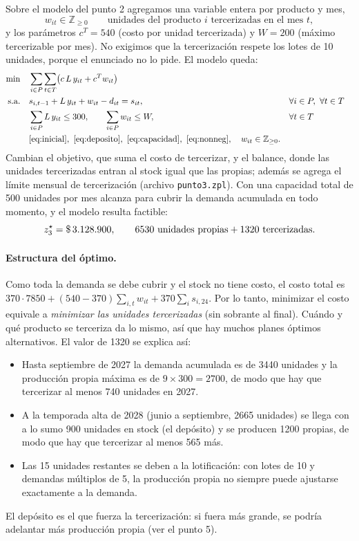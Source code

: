\documentclass[11pt,a4paper]{article}
\begin{document}
Sobre el modelo del punto 2 agregamos una variable entera por producto y mes,
\[
  w_{it} \in \mathbb{Z}_{\ge 0} \qquad \text{unidades del producto } i
  \text{ tercerizadas en el mes } t,
\]
y los parámetros $c^{T} = 540$ (costo por unidad tercerizada) y $W = 200$
(máximo tercerizable por mes). No exigimos que la tercerización respete los
lotes de 10 unidades, porque el enunciado no lo pide. El modelo queda:
\begin{align}
  \min\quad & \sum_{i\in P}\sum_{t\in T} \bigl(c\,L\,y_{it} + c^{T} w_{it}\bigr)
  \label{eq:obj3}\\
  \text{s.a.}\quad
  & s_{i,t-1} + L\,y_{it} + w_{it} - d_{it} = s_{it},
  && \forall i \in P,\ \forall t \in T
  \label{eq:balance3}\\
  & \sum_{i \in P} L\,y_{it} \le 300, \qquad \sum_{i \in P} w_{it} \le W,
  && \forall t \in T
  \label{eq:limites3}\\
  & \eqref{eq:inicial},\ \eqref{eq:deposito},\ \eqref{eq:capacidad},\
    \eqref{eq:nonneg}, \quad w_{it} \in \mathbb{Z}_{\ge 0}. \notag
\end{align}
Cambian el objetivo, que suma el costo de tercerizar, y el balance, donde las
unidades tercerizadas entran al stock igual que las propias; además se agrega
el límite mensual de tercerización (archivo \texttt{punto3.zpl}). Con una
capacidad total de 500 unidades por mes alcanza para cubrir la demanda
acumulada en todo momento, y el modelo resulta factible:
\[
  z^{\star}_3 = \$\,3.128.900, \qquad
  6530 \text{ unidades propias} + 1320 \text{ tercerizadas}.
\]

\paragraph{Estructura del óptimo.} Como toda la demanda se debe cubrir y el
stock no tiene costo, el costo total es
$370\cdot 7850 + (540-370)\sum_{i,t} w_{it} + 370 \sum_i s_{i,24}$. Por lo tanto,
minimizar el costo equivale a \emph{minimizar las unidades tercerizadas} (sin
sobrante al final). Cuándo y qué producto se terceriza da lo mismo, así que hay
muchos planes óptimos alternativos. El valor de 1320 se explica así:
\begin{itemize}[itemsep=1pt]
  \item Hasta septiembre de 2027 la demanda acumulada es de 3440 unidades y la
    producción propia máxima es de $9\times300 = 2700$, de modo que hay que
    tercerizar al menos 740 unidades en 2027.
  \item A la temporada alta de 2028 (junio a septiembre, 2665 unidades) se
    llega con a lo sumo 900 unidades en stock (el depósito) y se producen 1200
    propias, de modo que hay que tercerizar al menos 565 más.
  \item Las 15 unidades restantes se deben a la lotificación: con lotes de 10 y
    demandas múltiplos de 5, la producción propia no siempre puede ajustarse
    exactamente a la demanda.
\end{itemize}
El depósito es el que fuerza la tercerización: si fuera más grande, se podría
adelantar más producción propia (ver el punto 5).
\end{document}
